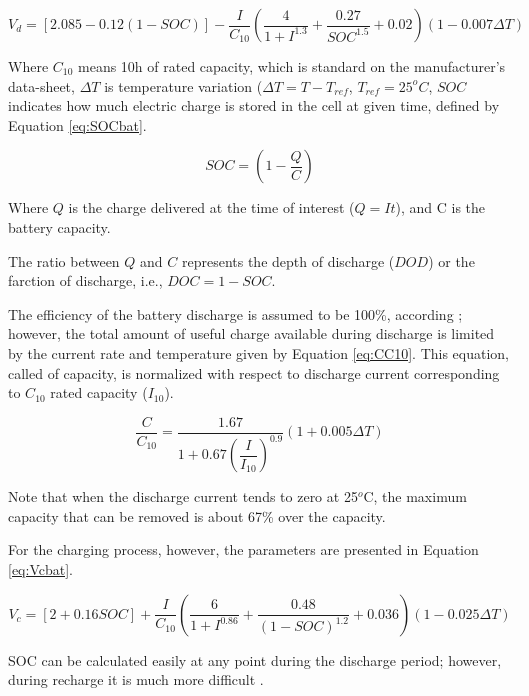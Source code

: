 \begin{equation}
\label{eq:bat_Vd}
V_{d} = \left[ 2.085-0.12(1-SOC) \right] - \dfrac{I}{C_{10}} \left( \dfrac{4}{1+I^{1.3}} + \dfrac{0.27}{SOC^{1.5}}+0.02 \right) (1-0.007 \Delta T)
\end{equation}

Where $ C_{10} $ means 10h of rated capacity, which is standard on the manufacturer's data-sheet, $ \Delta T $ is temperature variation ($ \Delta T=T-T_{ref} $, $ T_{ref}=25^{o}C $, $ SOC $ indicates how much electric charge is stored in the cell at given time, defined by Equation \ref{eq:SOCbat}.

\begin{equation}
\label{eq:SOCbat}
SOC = \left( 1 - \dfrac{Q}{C} \right) 
\end{equation}

Where $ Q $ is the charge delivered at the time of interest ($ Q=It $), and C is the battery capacity.

The ratio between $ Q $ and $ C $ represents the depth of discharge ($ DOD $) or the farction of discharge, i.e., $ DOC=1-SOC $.

The efficiency of the battery discharge is assumed to be 100\%, according \cite{Copetti}; however, the total amount of useful charge available during discharge is limited by the current rate and temperature given by Equation \ref{eq:CC10}. This equation, called of capacity, is normalized with respect to discharge current corresponding to $ C_{10} $ rated capacity ($ I_{10} $).

\begin{equation}
\label{eq:CC10}
\dfrac{C}{C_{10}} = \dfrac{1.67}{1+0.67 \left( \dfrac{I}{I_{10}} \right)^{0.9} }(1+0.005 \Delta T)
\end{equation}

Note that when the discharge current tends to zero at 25$^{o}$C, the maximum capacity that can be removed is about 67\% over the capacity.

For the charging process, however, the parameters are presented in Equation \ref{eq:Vcbat}.

\begin{equation}
\label{eq:Vcbat}
V_{c} = [2+0.16SOC]+ \dfrac{I}{C_{10}} \left( \dfrac{6}{1+I^{0.86}} + \dfrac{0.48}{(1-SOC)^{1.2}} + 0.036  \right) (1-0.025 \Delta T)
\end{equation}

SOC can be calculated easily at any point during the discharge period; however, during recharge it is much more difficult \cite{Copetti}.

